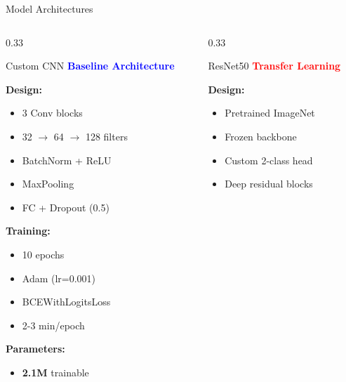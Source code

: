 \documentclass[aspectratio=169]{beamer}
\begin{document}
\begin{frame}{Model Architectures}
    \begin{columns}[T]
        \begin{column}{0.33\textwidth}
            \begin{block}{Custom CNN}
                \textcolor{blue}{\textbf{Baseline Architecture}}
                
                \textbf{Design:}
                \begin{itemize}
                    \scriptsize
                    \item 3 Conv blocks
                    \item 32 $\rightarrow$ 64 $\rightarrow$ 128 filters
                    \item BatchNorm + ReLU
                    \item MaxPooling
                    \item FC + Dropout (0.5)
                \end{itemize}
                
                \textbf{Training:}
                \begin{itemize}
                    \scriptsize
                    \item 10 epochs
                    \item Adam (lr=0.001)
                    \item BCEWithLogitsLoss
                    \item 2-3 min/epoch
                \end{itemize}
                
                \textbf{Parameters:}
                \begin{itemize}
                    \scriptsize
                    \item \textbf{2.1M} trainable
                \end{itemize}
            \end{block}
        \end{column}
        
        \begin{column}{0.33\textwidth}
            \begin{block}{ResNet50}
                \textcolor{red}{\textbf{Transfer Learning}}
                
                \textbf{Design:}
                \begin{itemize}
                    \scriptsize
                    \item Pretrained ImageNet
                    \item Frozen backbone
                    \item Custom 2-class head
                    \item Deep residual blocks
                \end{itemize}
                

\end{block}
\end{column}
\end{columns}
\end{frame}
\end{document}
